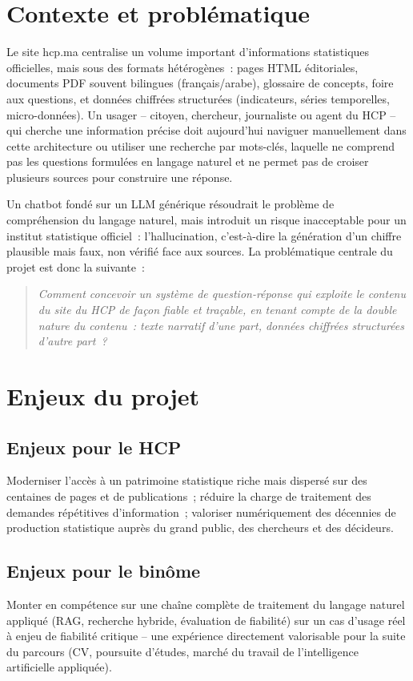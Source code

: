 \documentclass[11pt,a4paper]{article}
\begin{document}
\section{Contexte et probl\'ematique}
Le site hcp.ma centralise un volume important d'informations statistiques officielles, mais sous des formats h\'et\'erog\`enes~: pages HTML \'editoriales, documents PDF souvent bilingues (fran\c{c}ais/arabe), glossaire de concepts, foire aux questions, et donn\'ees chiffr\'ees structur\'ees (indicateurs, s\'eries temporelles, micro-donn\'ees). Un usager -- citoyen, chercheur, journaliste ou agent du HCP -- qui cherche une information pr\'ecise doit aujourd'hui naviguer manuellement dans cette architecture ou utiliser une recherche par mots-cl\'es, laquelle ne comprend pas les questions formul\'ees en langage naturel et ne permet pas de croiser plusieurs sources pour construire une r\'eponse.

Un chatbot fond\'e sur un LLM g\'en\'erique r\'esoudrait le probl\`eme de compr\'ehension du langage naturel, mais introduit un risque inacceptable pour un institut statistique officiel~: l'hallucination, c'est-\`a-dire la g\'en\'eration d'un chiffre plausible mais faux, non v\'erifi\'e face aux sources. La probl\'ematique centrale du projet est donc la suivante~:

\begin{quote}
\itshape Comment concevoir un syst\`eme de question-r\'eponse qui exploite le contenu du site du HCP de fa\c{c}on fiable et tra\c{c}able, en tenant compte de la double nature du contenu~: texte narratif d'une part, donn\'ees chiffr\'ees structur\'ees d'autre part~?
\end{quote}

\section{Enjeux du projet}
\subsection{Enjeux pour le HCP}
Moderniser l'acc\`es \`a un patrimoine statistique riche mais dispers\'e sur des centaines de pages et de publications~; r\'eduire la charge de traitement des demandes r\'ep\'etitives d'information~; valoriser num\'eriquement des d\'ecennies de production statistique aupr\`es du grand public, des chercheurs et des d\'ecideurs.

\subsection{Enjeux pour le bin\^ome}
Monter en comp\'etence sur une cha\^ine compl\`ete de traitement du langage naturel appliqu\'e (RAG, recherche hybride, \'evaluation de fiabilit\'e) sur un cas d'usage r\'eel \`a enjeu de fiabilit\'e critique -- une exp\'erience directement valorisable pour la suite du parcours (CV, poursuite d'\'etudes, march\'e du travail de l'intelligence artificielle appliqu\'ee).
\end{document}
